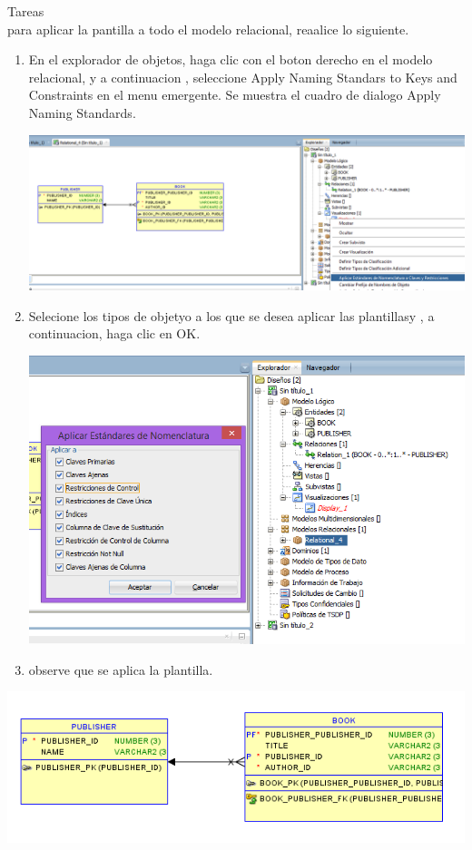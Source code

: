 \documentclass[12pt,letterpaper]{article}
\begin{document}
Tareas\\
para aplicar la pantilla a todo el modelo relacional, reaalice lo siguiente. 
\begin{enumerate}[1.]
    \item En el explorador de objetos, haga clic con el boton derecho en el modelo relacional, y a continuacion , seleccione Apply Naming Standars to Keys and Constraints en el menu emergente. Se muestra el cuadro de dialogo Apply Naming Standards. 
    
     \includegraphics[width=15cm]{./giselaImagen/imagen6.png} 
     
    \item Selecione los tipos de objetyo a los que se desea aplicar las plantillasy , a continuacion, haga clic en OK. 
    
    \includegraphics[width=15cm]{./giselaImagen/imagen7.png} 
    
    \item observe que se aplica la plantilla.  
		\end{enumerate}
		
		\includegraphics[width=15cm]{./giselaImagen/imagen8.png} 
		
\end{document}

